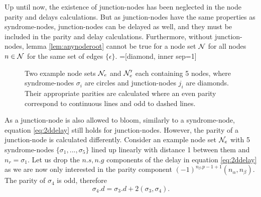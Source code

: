 Up until now, the existence of junction-nodes has been neglected in the node parity and delays calculations. But as junction-nodes have the same properties as syndrome-nodes, junction-nodes can be delayed as well, and they must be included in the parity and delay calculations. Furthermore, without junction-nodes, lemma \ref{lem:anynoderoot} cannot be true for a node set $\mathcal{N}$ for all nodes $n \in \mathcal{N}$ for the same set of edges $\{\epsilon\}$.
=[diamond, inner sep=1]
\begin{figure}
  \centering
  \caption{Two example node sets $\mathcal{N}_e$ and $\mathcal{N}_e'$ each containing 5 nodes, where syndrome-nodes $\sigma_i$ are circles and junction-nodes $j_i$ are diamonds. Their appropriate parities are calculated where an even parity correspond to continuous lines and odd to dashed lines. }\label{fig:junctionparity}
\end{figure}
As a junction-node is also allowed to bloom, similarly to a syndrome-node, equation \ref{eq:2ddelay} still holds for junction-nodes. However, the parity of a junction-node is calculated differently. Consider an example node set $\mathcal{N}_e$ with 5 syndrome-nodes $\{\sigma_1,...,\sigma_5\}$ lined up linearly with distance 1 between them and $n_r = \sigma_1$. Let us drop the $n.s, n.g$ components of the delay in equation \ref{eq:2ddelay} as we are now only interested in the parity component $(-1)^{n_\beta.p-1+1}(n_\alpha, n_\beta)$. The parity of $\sigma_4$ is odd, therefore
\begin{equation*}
  \sigma_4.d = \sigma_3.d + 2(\sigma_3, \sigma_4).
\end{equation*}

